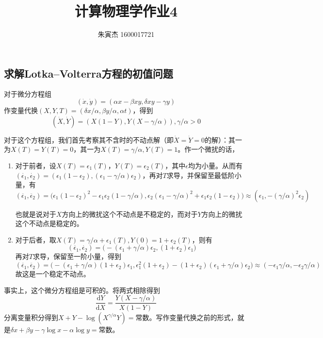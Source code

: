 \documentclass[UTF8,size=9.5]{ctexart}
\title{计算物理学作业4}
\author{朱寅杰 1600017721}
\date{}
\begin{document}
\maketitle
\setcounter{section}{4}
\subsection{求解Lotka–Volterra方程的初值问题}
对于微分方程组
\begin{equation}(\dot{x},\dot{y})=(\alpha x-\beta xy,\delta xy-\gamma y)\end{equation}
作变量代换$(X,Y,T)=(\delta x/\alpha,\beta y/\alpha,\alpha t)$，得到
\begin{equation}(\dot{X},\dot{Y})=(X(1-Y),Y(X-\gamma/\alpha)),\gamma/\alpha>0\end{equation}

对于这个方程组，我们首先考察其不含时的不动点解（即$\dot{X}=\dot{Y}=0$的解）：其一为$X(T)=Y(T)=0$，其一为$X(T)=\gamma/\alpha,Y(T)=1$。作一个微扰的话，
\begin{enumerate}[label={\alph*)},font=\bfseries]
\item
对于前者，设$X(T)=\epsilon_1(T)$，$Y(T)=\epsilon_2(T)$，其中$\epsilon$均为小量。从而有
$(\dot{\epsilon_1},\dot{\epsilon_2})= (\epsilon_1(1-\epsilon_2),(\epsilon_1-\gamma/\alpha)\epsilon_2)$，再对$T$求导，并保留至最低阶小量，有
\[(\ddot{\epsilon_1},\ddot{\epsilon_2})=\bigl(\epsilon_1(1-\epsilon_2)^2-\epsilon_1\epsilon_2(1-\gamma/\alpha),\epsilon_2(\epsilon_1-\gamma/\alpha)^2+\epsilon_1\epsilon_2(1-\epsilon_2)\bigr)\approx(\epsilon_1,-(\gamma/\alpha)^2\epsilon_2)\]

也就是说对于$X$方向上的微扰这个不动点是不稳定的，而对于$Y$方向上的微扰这个不动点是稳定的。
\item
对于后者，取$X(T)=\gamma/\alpha+\epsilon_1(T),Y(0)=1+\epsilon_2(T)$，则有
\[(\dot{\epsilon_1},\dot{\epsilon_2})=\bigl(-(\epsilon_1+\gamma/\alpha)\epsilon_2,(1+\epsilon_2)\epsilon_1\bigr)\]
再对$T$求导，保留至一阶小量，得到
\[(\ddot{\epsilon_1},\ddot{\epsilon_2})=\bigl(-(\epsilon_1+\gamma/\alpha)(1+\epsilon_2)\epsilon_1,\epsilon_1^2(1+\epsilon_2)-(1+\epsilon_2)(\epsilon_1+\gamma/\alpha)\epsilon_2\bigr)\approx(-\epsilon_1\gamma/\alpha,-\epsilon_2\gamma/\alpha)\]
故这是一个稳定不动点。
\end{enumerate}

事实上，这个微分方程组是可积的。将两式相除得到
\[\frac{\mathrm{d}Y}{\mathrm{d}X}=\frac{Y(X-\gamma/\alpha)}{X(1-Y)}\]
分离变量积分得到$X+Y-\log{(X^{\gamma/\alpha}Y)}=$常数。写作变量代换之前的形式，就是$\delta x+\beta y-\gamma\log{x}-\alpha\log{y}=$常数。
\end{document}
